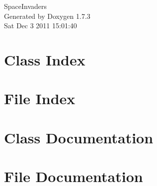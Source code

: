 \documentclass[a4paper]{book}
\begin{document}
\hypersetup{pageanchor=false}
\begin{titlepage}
\vspace*{7cm}
\begin{center}
{\Large SpaceInvaders }\\
\vspace*{1cm}
{\large Generated by Doxygen 1.7.3}\\
\vspace*{0.5cm}
{\small Sat Dec 3 2011 15:01:40}\\
\end{center}
\end{titlepage}
\clearemptydoublepage
{}
\tableofcontents
\clearemptydoublepage
{}
\hypersetup{pageanchor=true}
\chapter{Class Index}

\chapter{File Index}

\chapter{Class Documentation}

\chapter{File Documentation}
















\printindex
\end{document}
